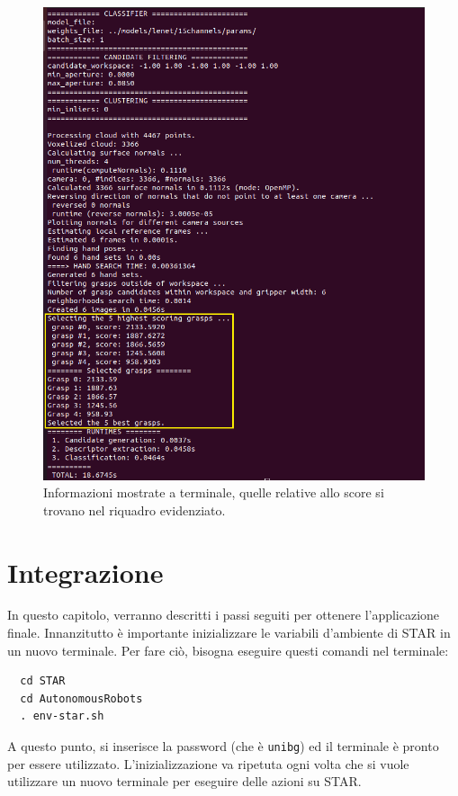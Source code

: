 \documentclass{report}
\begin{document}
\begin{figure}[h!]
	\centering
	\includegraphics[width=\textwidth]{immagini/gpd4}
	\caption{Informazioni mostrate a terminale, quelle relative allo score si trovano nel riquadro evidenziato.}
	\label{figura:imggpdt}
\end{figure}
\newpage
\chapter{Integrazione}\label{integrazione}
In questo capitolo, verranno descritti i passi seguiti per ottenere l'applicazione finale. Innanzitutto è importante inizializzare le variabili d'ambiente di STAR in un nuovo terminale. Per fare ciò, bisogna eseguire questi comandi nel terminale:
\begin{verbatim}
  cd STAR
  cd AutonomousRobots
  . env-star.sh
\end{verbatim}
A questo punto, si inserisce la password (che è \texttt{unibg}) ed il terminale è pronto per essere utilizzato. L'inizializzazione va ripetuta ogni volta che si vuole utilizzare un nuovo terminale per eseguire delle azioni su STAR. 
\end{document}
